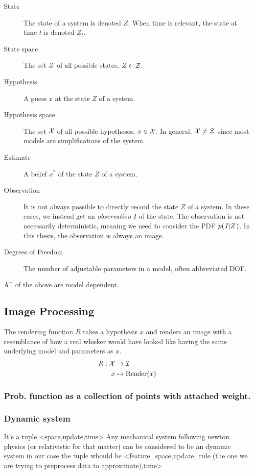\begin{description}
\item[State] The state of a system is denoted $Z$. When time is relevant, the state at time $t$ is denoted $Z_t$.
\item[State space] The set $\mathcal{Z}$ of all possible states, $Z \in \mathcal{Z}$.
\item[Hypothesis] A guess $x$ at the state $Z$ of a system.
\item[Hypothesis space] The set $\mathcal{X}$ of all possible hypotheses, $x \in \mathcal{X}$. In general, $\mathcal{X} \neq \mathcal{Z}$ since most models are simplifications of the system.
\item[Estimate] A belief $x^*$ of the state $Z$ of a system.
\item[Observation]
It is not always possible to directly record the state $Z$ of a system. In these cases, we instead get an \emph{observation} $I$ of the state. The observation is not necessarily deterministic, meaning we need to consider the PDF $p{(\left. I \middle\vert Z \right.)}$. In this thesis, the observation is always an image.
\item[Degrees of Freedom] The number of adjustable parameters in a model, often abbreviated DOF.
\end{description}

\begin{note}
  All of the above are model dependent.
\end{note}

\subsection{Image Processing}

\begin{definition}
  The rendering function $R$ takes a hypothesis $x$ and renders an image with a resemblance of how a real whisker would have looked like having the same underlying model and parameters as $x$.
  \begin{equation}
    \begin{split}
      R : \mathcal{X} &\rightarrow \mathcal{I}\\
      x &\mapsto \text{Render}(x)
    \end{split}
  \end{equation}
\end{definition}

\subsubsection{Prob. function as a collection of points with attached weight.}

\subsubsection{Dynamic system}
    It's a tuple <space,update,time>
    Any mechanical system following newton physics (or relativistic for that matter) can be considered to be an dynamic system
    in our case the tuple whould be <feature\_space,update\_rule (the one we are trying to preprocess data to approximate),time>

